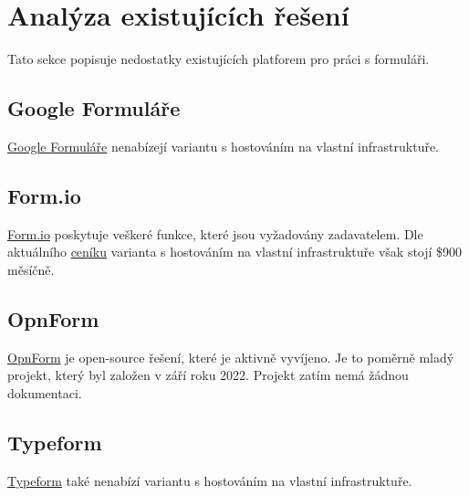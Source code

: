 \chapter{Analýza existujících řešení}\label{ch:analyza-existujicich-reseni-pro-praci-s-formulari}

Tato sekce popisuje nedostatky existujících platforem pro práci s formuláři.

\section*{Google Formuláře}\label{sec:google-formulare}

\href{https://www.google.com/forms/about/}{Google Formuláře} nenabízejí variantu s hostováním na vlastní infrastruktuře.

\section*{Form.io}\label{sec:formio}

\href{https://form.io/}{Form.io} poskytuje veškeré funkce, které jsou vyžadovány zadavatelem.
Dle aktuálního \href{https://form.io/pricing}{ceníku} varianta s hostováním na vlastní infrastruktuře však stojí \$900 měsíčně.

\section*{OpnForm}\label{sec:opnform}

\href{https://opnform.com/}{OpnForm} je open-source řešení, které je aktivně vyvíjeno.
Je to poměrně mladý projekt, který byl založen v září roku 2022.
Projekt zatím nemá žádnou dokumentaci.

\section*{Typeform}\label{sec:typeform}

\href{https://www.typeform.com/}{Typeform} také nenabízí variantu s hostováním na vlastní infrastruktuře.


